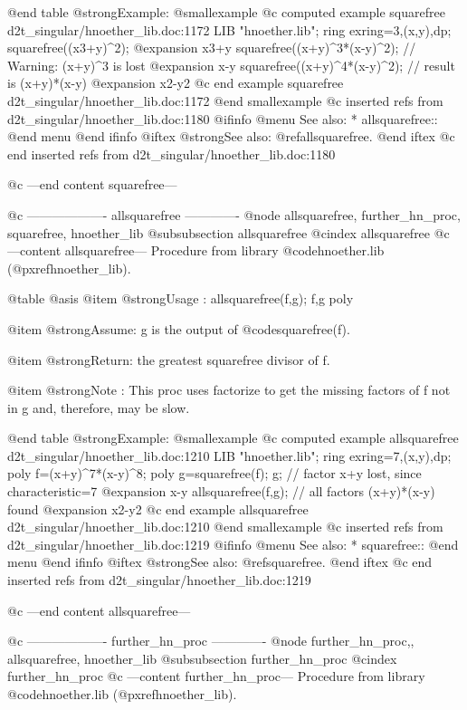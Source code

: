 @end table
@strong{Example:}
@smallexample
@c computed example squarefree d2t_singular/hnoether_lib.doc:1172 
LIB "hnoether.lib";
ring exring=3,(x,y),dp;
squarefree((x3+y)^2);
@expansion{} x3+y
squarefree((x+y)^3*(x-y)^2); // Warning: (x+y)^3 is lost
@expansion{} x-y
squarefree((x+y)^4*(x-y)^2); // result is (x+y)*(x-y)
@expansion{} x2-y2
@c end example squarefree d2t_singular/hnoether_lib.doc:1172
@end smallexample
@c inserted refs from d2t_singular/hnoether_lib.doc:1180
@ifinfo
@menu
See also:
* allsquarefree::
@end menu
@end ifinfo
@iftex
@strong{See also:}
@ref{allsquarefree}.
@end iftex
@c end inserted refs from d2t_singular/hnoether_lib.doc:1180

@c ---end content squarefree---

@c ------------------- allsquarefree -------------
@node allsquarefree, further_hn_proc, squarefree, hnoether_lib
@subsubsection allsquarefree
@cindex allsquarefree
@c ---content allsquarefree---
Procedure from library @code{hnoether.lib} (@pxref{hnoether_lib}).

@table @asis
@item @strong{Usage :}
allsquarefree(f,g); f,g poly

@item @strong{Assume:}
g is the output of @code{squarefree(f)}.

@item @strong{Return:}
the greatest squarefree divisor of f.

@item @strong{Note  :}
This proc uses factorize to get the missing factors of f not in g and,
therefore, may be slow.

@end table
@strong{Example:}
@smallexample
@c computed example allsquarefree d2t_singular/hnoether_lib.doc:1210 
LIB "hnoether.lib";
ring exring=7,(x,y),dp;
poly f=(x+y)^7*(x-y)^8;
poly g=squarefree(f);
g;                      // factor x+y lost, since characteristic=7
@expansion{} x-y
allsquarefree(f,g);     // all factors (x+y)*(x-y) found
@expansion{} x2-y2
@c end example allsquarefree d2t_singular/hnoether_lib.doc:1210
@end smallexample
@c inserted refs from d2t_singular/hnoether_lib.doc:1219
@ifinfo
@menu
See also:
* squarefree::
@end menu
@end ifinfo
@iftex
@strong{See also:}
@ref{squarefree}.
@end iftex
@c end inserted refs from d2t_singular/hnoether_lib.doc:1219

@c ---end content allsquarefree---

@c ------------------- further_hn_proc -------------
@node further_hn_proc,, allsquarefree, hnoether_lib
@subsubsection further_hn_proc
@cindex further_hn_proc
@c ---content further_hn_proc---
Procedure from library @code{hnoether.lib} (@pxref{hnoether_lib}).

